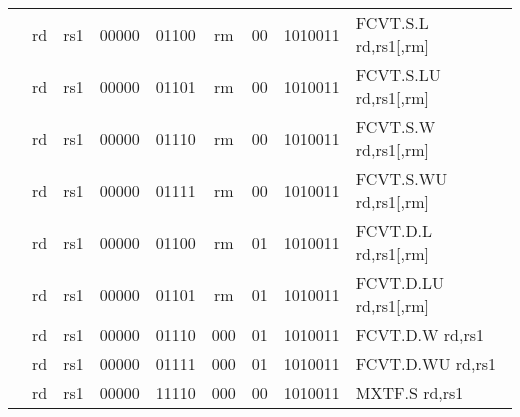 \begin{table}[p]
\begin{small}
\begin{center}
\begin{tabular}{rccccccccccl}
&
\multicolumn{1}{|c|}{rd} &
\multicolumn{1}{c|}{rs1} &
\multicolumn{1}{c|}{00000} &
\multicolumn{3}{c|}{01100} &
\multicolumn{2}{c|}{rm} &
\multicolumn{1}{c|}{00} &
\multicolumn{1}{c|}{1010011} & FCVT.S.L rd,rs1[,rm] \\
\cline{2-11}
  

&
\multicolumn{1}{|c|}{rd} &
\multicolumn{1}{c|}{rs1} &
\multicolumn{1}{c|}{00000} &
\multicolumn{3}{c|}{01101} &
\multicolumn{2}{c|}{rm} &
\multicolumn{1}{c|}{00} &
\multicolumn{1}{c|}{1010011} & FCVT.S.LU rd,rs1[,rm] \\
\cline{2-11}
  

&
\multicolumn{1}{|c|}{rd} &
\multicolumn{1}{c|}{rs1} &
\multicolumn{1}{c|}{00000} &
\multicolumn{3}{c|}{01110} &
\multicolumn{2}{c|}{rm} &
\multicolumn{1}{c|}{00} &
\multicolumn{1}{c|}{1010011} & FCVT.S.W rd,rs1[,rm] \\
\cline{2-11}
  

&
\multicolumn{1}{|c|}{rd} &
\multicolumn{1}{c|}{rs1} &
\multicolumn{1}{c|}{00000} &
\multicolumn{3}{c|}{01111} &
\multicolumn{2}{c|}{rm} &
\multicolumn{1}{c|}{00} &
\multicolumn{1}{c|}{1010011} & FCVT.S.WU rd,rs1[,rm] \\
\cline{2-11}
  

&
\multicolumn{1}{|c|}{rd} &
\multicolumn{1}{c|}{rs1} &
\multicolumn{1}{c|}{00000} &
\multicolumn{3}{c|}{01100} &
\multicolumn{2}{c|}{rm} &
\multicolumn{1}{c|}{01} &
\multicolumn{1}{c|}{1010011} & FCVT.D.L rd,rs1[,rm] \\
\cline{2-11}
  

&
\multicolumn{1}{|c|}{rd} &
\multicolumn{1}{c|}{rs1} &
\multicolumn{1}{c|}{00000} &
\multicolumn{3}{c|}{01101} &
\multicolumn{2}{c|}{rm} &
\multicolumn{1}{c|}{01} &
\multicolumn{1}{c|}{1010011} & FCVT.D.LU rd,rs1[,rm] \\
\cline{2-11}
  

&
\multicolumn{1}{|c|}{rd} &
\multicolumn{1}{c|}{rs1} &
\multicolumn{1}{c|}{00000} &
\multicolumn{3}{c|}{01110} &
\multicolumn{2}{c|}{000} &
\multicolumn{1}{c|}{01} &
\multicolumn{1}{c|}{1010011} & FCVT.D.W rd,rs1 \\
\cline{2-11}
  

&
\multicolumn{1}{|c|}{rd} &
\multicolumn{1}{c|}{rs1} &
\multicolumn{1}{c|}{00000} &
\multicolumn{3}{c|}{01111} &
\multicolumn{2}{c|}{000} &
\multicolumn{1}{c|}{01} &
\multicolumn{1}{c|}{1010011} & FCVT.D.WU rd,rs1 \\
\cline{2-11}
  

&
\multicolumn{1}{|c|}{rd} &
\multicolumn{1}{c|}{rs1} &
\multicolumn{1}{c|}{00000} &
\multicolumn{3}{c|}{11110} &
\multicolumn{2}{c|}{000} &
\multicolumn{1}{c|}{00} &
\multicolumn{1}{c|}{1010011} & MXTF.S rd,rs1 \\
\cline{2-11}
  


\end{tabular}
\end{center}
\end{small}
\end{table}
